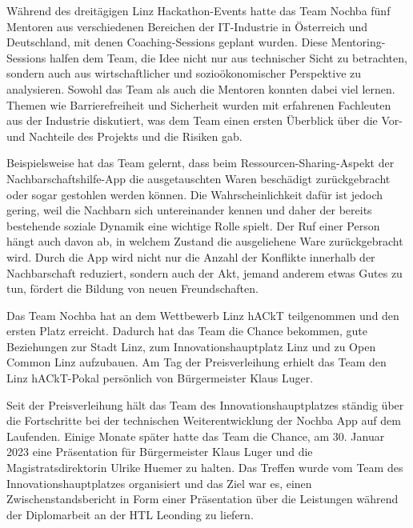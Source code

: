 Während des dreitägigen Linz Hackathon-Events hatte das Team Nochba fünf Mentoren aus verschiedenen Bereichen der IT-Industrie in Österreich und Deutschland, mit denen Coaching-Sessions geplant wurden. Diese Mentoring-Sessions halfen dem Team, die Idee nicht nur aus technischer Sicht zu betrachten, sondern auch aus wirtschaftlicher und sozioökonomischer Perspektive zu analysieren. Sowohl das Team als auch die Mentoren konnten dabei viel lernen. Themen wie Barrierefreiheit und Sicherheit wurden mit erfahrenen Fachleuten aus der Industrie diskutiert, was dem Team einen ersten Überblick über die Vor- und Nachteile des Projekts und die Risiken gab.

Beispielsweise hat das Team gelernt, dass beim Ressourcen-Sharing-Aspekt der Nachbarschaftshilfe-App die ausgetauschten Waren beschädigt zurückgebracht oder sogar gestohlen werden können. Die Wahrscheinlichkeit dafür ist jedoch gering, weil die Nachbarn sich untereinander kennen und daher der bereits bestehende soziale Dynamik eine wichtige Rolle spielt. Der Ruf einer Person hängt auch davon ab, in welchem Zustand die ausgeliehene Ware zurückgebracht wird. Durch die App wird nicht nur die Anzahl der Konflikte innerhalb der Nachbarschaft reduziert, sondern auch der Akt, jemand anderem etwas Gutes zu tun, fördert die Bildung von neuen Freundschaften.

Das Team Nochba hat an dem Wettbewerb Linz hACkT teilgenommen und den ersten Platz erreicht. Dadurch hat das Team die Chance bekommen, gute Beziehungen zur Stadt Linz, zum Innovationshauptplatz Linz und zu Open Common Linz aufzubauen. Am Tag der Preisverleihung erhielt das Team den Linz hACkT-Pokal persönlich von Bürgermeister Klaus Luger.

Seit der Preisverleihung hält das Team des Innovationshauptplatzes ständig über die Fortschritte bei der technischen Weiterentwicklung der Nochba App auf dem Laufenden. Einige Monate später hatte das Team die Chance, am 30. Januar 2023 eine Präsentation für Bürgermeister Klaus Luger und die Magistratsdirektorin Ulrike Huemer zu halten. Das Treffen wurde vom Team des Innovationshauptplatzes organisiert und das Ziel war es, einen Zwischenstandsbericht in Form einer Präsentation über die Leistungen während der Diplomarbeit an der HTL Leonding zu liefern.

